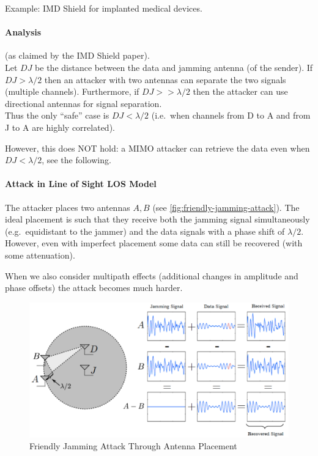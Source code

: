 Example: IMD Shield for implanted medical devices.

\paragraph{Analysis} (as claimed by the IMD Shield paper). \\
Let $DJ$ be the distance between the data and jamming antenna (of the sender).
If $DJ > \lambda/2$ then an attacker with two antennas can separate the two signals (multiple channels).
Furthermore, if $DJ >> \lambda/2$ then the attacker can use directional antennas for signal separation.
\\
Thus the only ``safe'' case is $DJ < \lambda/2$ (i.e.\ when channels from D to A and from J to A are highly correlated).

However, this does NOT hold:
a MIMO attacker can retrieve the data even when $DJ < \lambda/2$, see the following.

\paragraph{Attack in Line of Sight LOS Model} 
The attacker places two antennas $A, B$ (see \autoref{fig:friendly-jamming-attack}).
The ideal placement is such that they receive both the jamming signal simultaneously (e.g.\ equidistant to the jammer) and the data signals with a phase shift of $\lambda/2$.
However, even with imperfect placement some data can still be recovered (with some attenuation).

When we also consider multipath effects (additional changes in amplitude and phase offsets) the attack becomes much harder.

\begin{figure}[h]
	\centering
	\includegraphics[scale=0.4]{images/7-friendly-jamming-attack.png}
	\caption{Friendly Jamming Attack Through Antenna Placement}%
	\label{fig:friendly-jamming-attack}
\end{figure}


